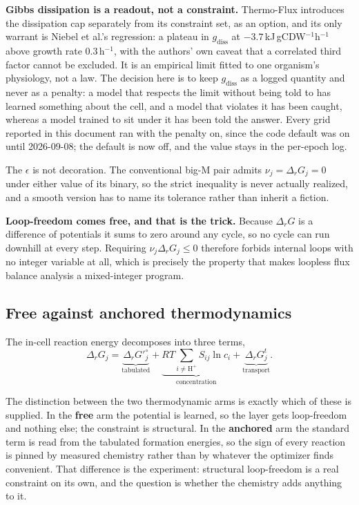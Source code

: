 \textbf{Gibbs dissipation is a readout, not a constraint.} Thermo-Flux introduces the
dissipation cap separately from its constraint set, as an option, and its only warrant is
Niebel et al.'s regression: a plateau in $g_{\mathrm{diss}}$ at $-3.7$\,kJ\,gCDW$^{-1}$h$^{-1}$
above growth rate 0.3\,h$^{-1}$, with the authors' own caveat that a correlated third
factor cannot be excluded. It is an empirical limit fitted to one organism's physiology,
not a law. The decision here is to keep $g_{\mathrm{diss}}$ as a logged quantity and never
as a penalty: a model that respects the limit without being told to has learned something
about the cell, and a model that violates it has been caught, whereas a model trained to
sit under it has been told the answer. Every grid reported in this document ran with the
penalty on, since the code default was on until 2026-09-08; the default is now off, and
the value stays in the per-epoch log.

The $\epsilon$ is not decoration. The conventional big-M pair admits
$\nu_j = \Delta_r G_j = 0$ under either value of its binary, so the strict inequality is
never actually realized, and a smooth version has to name its tolerance rather than inherit
a fiction.

\textbf{Loop-freedom comes free, and that is the trick.} Because $\Delta_r G$ is a
difference of potentials it sums to zero around any cycle, so no cycle can run downhill at
every step. Requiring $\nu_j \Delta_r G_j \le 0$ therefore forbids internal loops with no
integer variable at all, which is precisely the property that makes loopless flux balance
analysis a mixed-integer program.

\subsection{Free against anchored thermodynamics}

The in-cell reaction energy decomposes into three terms,
\begin{equation}
  \Delta_r G_j
  = \underbrace{\Delta_r G'^{\circ}_j}_{\text{tabulated}}
  + \underbrace{RT\!\!\sum_{i \neq \mathrm{H}^+}\!\! S_{ij} \ln c_i}_{\text{concentration}}
  + \underbrace{\Delta_r G^{t}_j}_{\text{transport}} .
\end{equation}

The distinction between the two thermodynamic arms is exactly which of these is supplied.
In the \textbf{free} arm the potential is learned, so the layer gets loop-freedom and
nothing else; the constraint is structural. In the \textbf{anchored} arm the standard term
is read from the tabulated formation energies, so the sign of every reaction is pinned by
measured chemistry rather than by whatever the optimizer finds convenient. That difference
is the experiment: structural loop-freedom is a real constraint on its own, and the
question is whether the chemistry adds anything to it.

